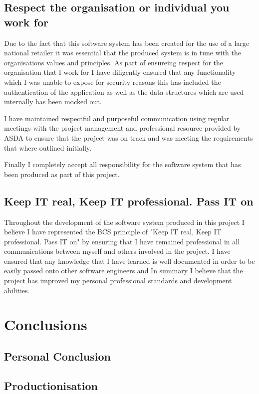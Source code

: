 \documentclass[a4paper,11pt]{report}
\begin{document}
\section{Respect the organisation or individual you work for}
Due to the fact that this software system has been created for the use of a large national retailer it was essential that the produced system is in tune with the organisations values and principles. 
As part of ensureing respect for the organisation that I work for I have diligently ensured that any functionality which I was unable to expose for security reasons this has included the authentication of the application as well as the data structures which are used internally has been mocked out.

I have maintained respectful and purposeful communication using regular meetings with the project management and professional resource provided by ASDA to ensure that the project was on track and was meeting the requirements that where outlined initially.

Finally I completely accept all responsibility for the software system that has been produced as part of this project. 

\section{Keep IT real, Keep IT professional. Pass IT on}
Throughout the development of the software system produced in this project I believe I have represented the BCS principle of 
"Keep IT real, Keep IT professional. Pass IT on" by ensuring that I have remained professional in all communications between
myself and others involved in the project. I have ensured that any knowledge that I have learned is well documented in order
to be easily passed onto other software engineers and In summary I believe that the project has improved my personal professional
standards and development abilities.

\chapter{Conclusions}
\section{Personal Conclusion}
\section{Productionisation}
\end{document}
